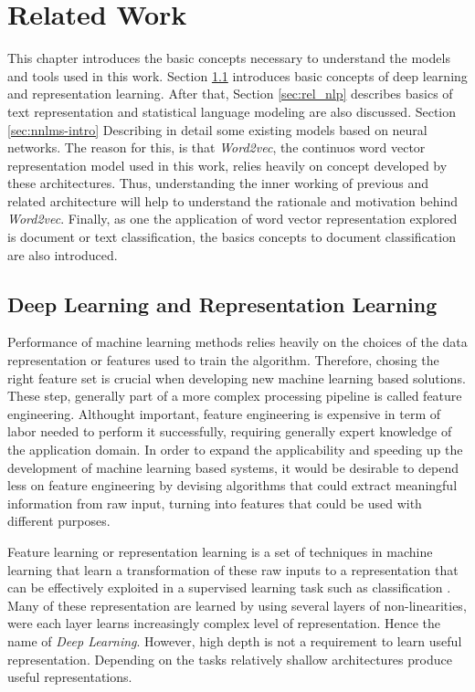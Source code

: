 
\chapter{Related Work}
\label{chap:related_work}

This chapter introduces the basic concepts necessary to understand the models and tools  used in this work. Section \ref{sec:deep_learning} introduces basic concepts of deep learning and representation learning. After that, Section \ref{sec:rel_nlp} describes basics of text representation and  statistical language modeling are also discussed. Section \ref{sec:nnlms-intro} Describing in detail some existing  models based on neural networks. The reason for this, is that  \textit{Word2vec}, the continuos word vector representation  model used in this work,  relies heavily on concept developed by these architectures. Thus, understanding the inner working of previous and related architecture  will help to understand the rationale and motivation behind \textit{Word2vec}. Finally, as one the application of word vector representation explored is document or text classification, the basics concepts to document classification are also introduced.

\section{Deep Learning and Representation Learning}
 \label{sec:deep_learning}
Performance of machine learning methods relies heavily on the choices of the
data representation or features used to train the algorithm. Therefore,
chosing the right feature set is crucial when developing new machine learning
based solutions. These step, generally part of a more complex processing
pipeline is called feature engineering.
Althought important, feature engineering is expensive in term of labor needed
to perform it successfully, requiring  generally  expert knowledge of the application
domain.  In order to expand the applicability and speeding up the
development of machine learning based systems, it would be desirable to
depend less on feature engineering by devising algorithms  that could extract
meaningful  information from raw input, turning into features that could be
used with different purposes.

Feature learning or representation learning is a set of techniques in machine
learning that learn a transformation of these raw inputs to a representation that
can be effectively exploited in a supervised learning task such as
classification \cite{DBLP:journals/corr/abs-1206-5538}. 
Many of these representation  are learned by using several layers of
non-linearities, were each layer learns increasingly complex level of
representation. Hence the name of \textit{Deep Learning}. However, high depth is
not a requirement to learn useful representation. Depending on the tasks
relatively shallow architectures produce useful representations.

